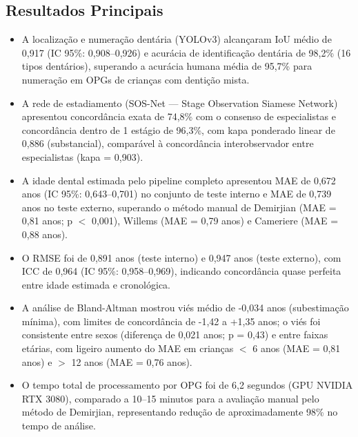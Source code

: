 \subsection{Resultados Principais}
\begin{itemize}
  \item A localização e numeração dentária (YOLOv3) alcançaram IoU
        médio de 0,917 (IC 95\%: 0,908--0,926) e acurácia de
        identificação dentária de 98,2\% (16 tipos dentários),
        superando a acurácia humana média de 95,7\% para numeração
        em OPGs de crianças com dentição mista.
  \item A rede de estadiamento (SOS-Net — Stage Observation Siamese
        Network) apresentou concordância exata de 74,8\% com o
        consenso de especialistas e concordância dentro de 1 estágio
        de 96,3\%, com kapa ponderado linear de 0,886 (substancial),
        comparável à concordância interobservador entre especialistas
        (kapa = 0,903).
  \item A idade dental estimada pelo pipeline completo apresentou MAE
        de 0,672 anos (IC 95\%: 0,643--0,701) no conjunto de teste
        interno e MAE de 0,739 anos no teste externo, superando o
        método manual de Demirjian (MAE = 0,81 anos; p $<$ 0,001),
        Willems (MAE = 0,79 anos) e Cameriere (MAE = 0,88 anos).
  \item O RMSE foi de 0,891 anos (teste interno) e 0,947 anos (teste
        externo), com ICC de 0,964 (IC 95\%: 0,958--0,969), indicando
        concordância quase perfeita entre idade estimada e cronológica.
  \item A análise de Bland-Altman mostrou viés médio de -0,034 anos
        (subestimação mínima), com limites de concordância de
        -1,42 a +1,35 anos; o viés foi consistente entre sexos
        (diferença de 0,021 anos; p = 0,43) e entre faixas etárias,
        com ligeiro aumento do MAE em crianças $<$ 6 anos
        (MAE = 0,81 anos) e $>$ 12 anos (MAE = 0,76 anos).
  \item O tempo total de processamento por OPG foi de 6,2 segundos
        (GPU NVIDIA RTX 3080), comparado a 10--15 minutos para a
        avaliação manual pelo método de Demirjian, representando
        redução de aproximadamente 98\% no tempo de análise.
\end{itemize}

